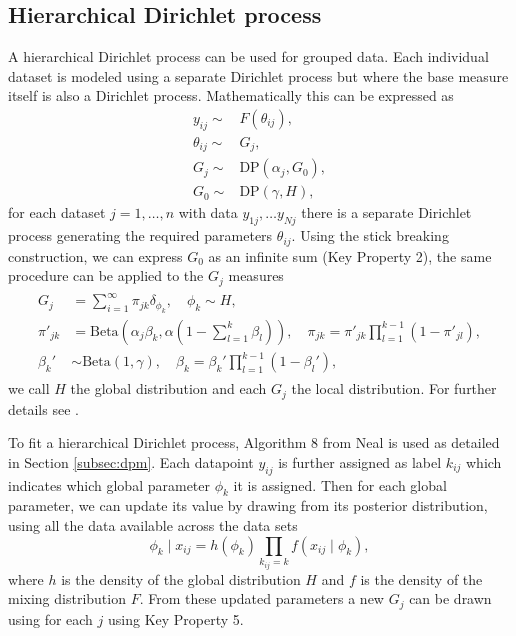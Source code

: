 \documentclass[nojss]{jss}
\begin{document}
\subsection{Hierarchical Dirichlet process}
A hierarchical Dirichlet process can be used for grouped data. Each individual dataset is modeled using a separate Dirichlet process but where the base measure itself is also a Dirichlet process. Mathematically this can be expressed as
\begin{align*}
y_{ij}  \sim & F(\theta _{ij}), \\
\theta _{ij} \sim & G_j, \\
G_j \sim & \text{DP} (\alpha _j, G_0 ), \\
G_0 \sim & \text{DP} (\gamma, H),
\end{align*}
for each dataset $j=1, \dots,n$ with data $y_{1j}, \ldots y_{Nj}$ there is a separate Dirichlet process generating the required parameters $\theta _{ij}$. Using the stick breaking construction, we can express $G_0$ as an infinite sum (Key Property 2), the same procedure can be applied to the $G_j$ measures
\begin{align}
\begin{split}
G_j & = \sum _{i=1} ^\infty \pi _{jk} \delta _{\phi _k}, \quad \phi _k  \sim H, \\
\pi ' _{jk} & = \text{Beta}  \left( \alpha _j \beta _k , \alpha \left( 1 - \sum _{l=1} ^k \beta _l \right) \right), \quad
\pi _{jk}  = \pi ' _{jk} \prod _{l=1} ^{k-1} ( 1- \pi ' _{jl} ), \\
\beta _k ' &  \sim  \text{Beta} \left(1, \gamma \right), \quad
\beta _k  = \beta _k ' \prod_ {l=1} ^{k-1} (1 - \beta _l '),
\end{split}
\label{eq:hierbase}
\end{align}
we call $H$ the global distribution and each $G_j$ the local distribution. For further details see \cite{teh_sharing_2005}.

To fit a hierarchical Dirichlet process, Algorithm 8 from Neal is used as detailed in Section \ref{subsec:dpm}. Each datapoint $y_{ij}$ is further assigned as label $k_{ij}$ which indicates which global parameter $\phi _k$ it is assigned. Then for each global parameter, we can update its value by drawing from its posterior distribution, using all the data available across the data sets
\begin{equation}
\phi _k \mid x_{ij} = h(\phi _k) \prod _{k_{ij} = k} f(x_{ij} \mid \phi _k ) ,
\label{eq:hierposterior}
\end{equation}
where $h$ is the density of the global distribution $H$ and $f$ is the density of the mixing distribution $F$. From these updated parameters a new $G_j$ can be drawn using for each $j$ using Key Property 5.
\end{document}
